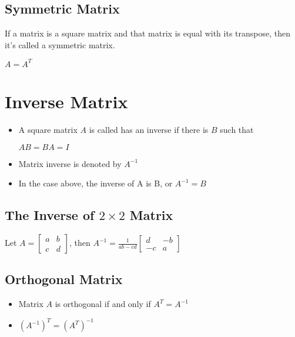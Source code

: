 \documentclass[a4paper,12pt]{article}
\begin{document}
\subsection*{Symmetric Matrix}
If a matrix is a square matrix and that matrix is equal with its transpose, then it’s called a symmetric matrix.
\begin{center}
  \(A=A^T\)
\end{center}

\section*{Inverse Matrix}
\begin{itemize}
  \item A square matrix \(A\) is called has an inverse if there is \(B\) such that \begin{center}\( AB=BA=I\)\end{center}
  \item Matrix inverse is denoted by \(A^{-1}\)
  \item In the case above, the inverse of A is B, or \(A^{-1}=B\)
\end{itemize}

\subsection*{The Inverse of \(2\times 2\) Matrix}
Let \(A=\begin{bmatrix}a & b \\ c & d\end{bmatrix}\), then \(A^{-1}=\frac{1}{ab-cd}\begin{bmatrix}d & -b \\ -c & a\end{bmatrix}\)

\subsection*{Orthogonal Matrix}
\begin{itemize}
  \item Matrix \(A\) is orthogonal if and only if \(A^{T}=A^{-1}\)
  \item \((A^{-1})^T=(A^T)^{-1}\)
\end{itemize}
\end{document}
